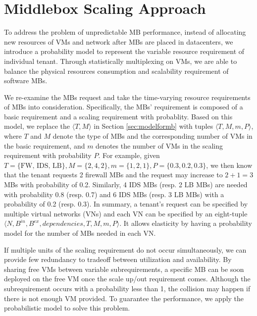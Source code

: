 \documentclass[review]{elsarticle}
\begin{document}
\section{Middlebox Scaling Approach}\label{sec:scalibility}
To address the problem of unpredictable MB performance, instead of allocating new resources of VMs and network after MBs are placed in datacenters, we introduce a probability model to represent the variable resource requirement of individual tenant. Through statistically multiplexing on VMs, we are able to balance the physical resources consumption and scalability requirement of software MBs. 

We re-examine the MBs request and take the time-varying resource requirements of MBs into consideration. Specifically, the MBs' requirement is composed of a basic requirement and a scaling requirement with probablity. Based on this model, we replace the $\langle T, M \rangle$ in Section \ref{sec:modelformb} with tuples $\langle T, M, m, P\rangle$, where $T$ and $M$  denote the type of MBs and the corresponding number of VMs in the basic requirement, and $m$ denotes the number of VMs in the scaling requirement with probability $P$. For example, given $T=\{\text{FW, IDS, LB}\}, M=\{ 2, 4, 2\}, m=\{1, 2, 1\}, P=\{0.3, 0.2, 0.3\}$, we then know that the tenant requests 2 firewall MBs and the request may increase to $2+1=3$ MBs with probability of 0.2. Similarly, 4 IDS MBs (resp. 2 LB MBs) are needed with probability 0.8 (resp. 0.7) and 6 IDS MBs (resp. 3 LB MBs) with a probability of 0.2 (resp. 0.3). In summary, a tenant's request can be specified by multiple virtual networks (VNs) and each VN can be specified by an eight-tuple $\langle N, B^{in}, B^{ex}, dependencies, T, M, m, P\rangle$. It allows elasticity by having a probability model for the number of MBs needed in each VN. 

If multiple units of the scaling requirement do not occur simultaneously, we can provide few redundancy to tradeoff between utilization and availability. By sharing free VMs between variable subrequirements, a specific MB can be soon deployed on the free VM once the scale up/out requirement comes. Although the subrequirement occurs with a probability less than 1, the collision may happen if there is not enough VM provided. To guarantee the performance, we apply the probabilistic model to solve this problem. 
\end{document}
